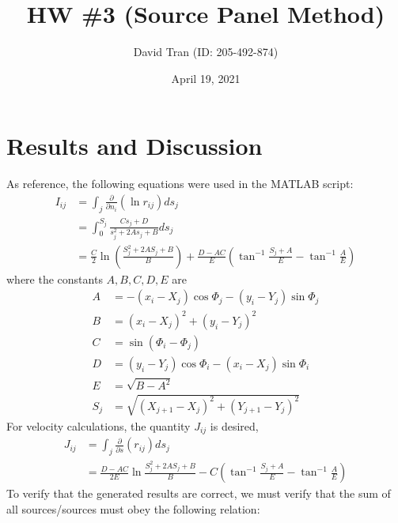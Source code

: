 \documentclass[12pt]{article}
\title{\vspace{-1.75cm}HW \#3 (Source Panel Method)}
\author{David Tran (ID: 205-492-874)}
\date{April 19, 2021}
\begin{document}
\maketitle
\vspace{-1.75cm}
\thispagestyle{fancy}   %

\section*{Results and Discussion}
As reference, the following equations were used in the MATLAB script:
\begin{equation}
    \begin{aligned}
    I_{ij} &= \int_j \frac{\partial}{\partial n_i}\left(\ln r_{ij}\right)ds_j \\
    &= \int_{0}^{S_j}\frac{Cs_j + D}{s_j^2 + 2As_j + B}ds_j \\
    &= \frac{C}{2}\ln\left(\frac{S_j^2 + 2AS_j + B}{B} \right) + \frac{D - AC}{E}\left(\tan^{-1}\frac{S_j + A}{E} - \tan^{-1}\frac{A}{E} \right)
    \end{aligned}
\end{equation}
where the constants $A, B, C, D, E$ are
\begin{equation*}
    \begin{aligned}
    A &= -\left(x_i - X_j \right)\cos\Phi_j - \left(y_i - Y_j \right)\sin\Phi_j \\
    B &= \left(x_i - X_j \right)^2 + \left(y_i - Y_j \right)^2 \\
    C &= \sin\left(\Phi_i - \Phi_j \right) \\
    D &= \left(y_i - Y_j \right)\cos\Phi_i - \left(x_i - X_j \right)\sin\Phi_i \\
    E &= \sqrt{B - A^2} \\
    S_j &= \sqrt{\left(X_{j + 1} - X_j \right)^2 + \left(Y_{j+1} - Y_j \right)^2}
    \end{aligned}
\end{equation*}
For velocity calculations, the quantity $J_{ij}$ is desired,
\begin{equation}
    \begin{aligned}
    J_{ij} &= \int_j \frac{\partial}{\partial s}\left(r_{ij} \right)ds_j \\
    &= \frac{D - AC}{2E}\ln\frac{S_j^2 + 2AS_j + B}{B} - C\left(\tan^{-1}\frac{S_j + A}{E} - \tan^{-1}\frac{A}{E} \right)
    \end{aligned}
\end{equation}
To verify that the generated results are correct, we must verify that the sum of all sources/sources must obey the following relation:
\end{document}
